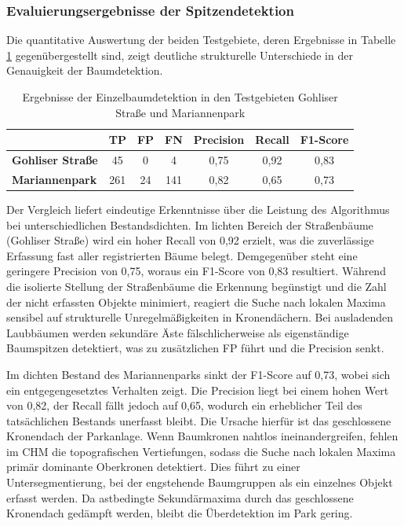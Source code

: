 \subsubsection{Evaluierungsergebnisse der Spitzendetektion}

Die quantitative Auswertung der beiden Testgebiete, deren Ergebnisse in Tabelle \ref{tab:evaluierung} gegenübergestellt sind, zeigt deutliche strukturelle Unterschiede in der Genauigkeit der Baumdetektion.

\begin{table}[htbp]
\centering
\caption{Ergebnisse der Einzelbaumdetektion in den Testgebieten Gohliser Straße und Mariannenpark}
\label{tab:evaluierung}
\begin{tabular}{l c c c c c c}
\toprule
\textbf{} & \textbf{TP} & \textbf{FP} & \textbf{FN} & \textbf{Precision} & \textbf{Recall} & \textbf{F1-Score} \\
\midrule
\textbf{Gohliser Straße} & 45 & 0 & 4 & 0,75 & 0,92 & 0,83 \\
\addlinespace
\textbf{Mariannenpark} & 261 & 24 & 141 & 0,82 & 0,65 & 0,73 \\
\bottomrule
\end{tabular}
\end{table}

Der Vergleich liefert eindeutige Erkenntnisse über die Leistung des Algorithmus bei unterschiedlichen Bestandsdichten. Im lichten Bereich der Straßenbäume (Gohliser Straße) wird ein hoher Recall von 0,92 erzielt, was die zuverlässige Erfassung fast aller registrierten Bäume belegt. Demgegenüber steht eine geringere Precision von 0,75, woraus ein F1-Score von 0,83 resultiert. Während die isolierte Stellung der Straßenbäume die Erkennung begünstigt und die Zahl der nicht erfassten Objekte minimiert, reagiert die Suche nach lokalen Maxima sensibel auf strukturelle Unregelmäßigkeiten in Kronendächern. Bei ausladenden Laubbäumen werden sekundäre Äste fälschlicherweise als eigenständige Baumspitzen detektiert, was zu zusätzlichen FP führt und die Precision senkt.

Im dichten Bestand des Mariannenparks sinkt der F1-Score auf 0,73, wobei sich ein entgegengesetztes Verhalten zeigt. Die Precision liegt bei einem hohen Wert von 0,82, der Recall fällt jedoch auf 0,65, wodurch ein erheblicher Teil des tatsächlichen Bestands unerfasst bleibt. Die Ursache hierfür ist das geschlossene Kronendach der Parkanlage. Wenn Baumkronen nahtlos ineinandergreifen, fehlen im CHM die topografischen Vertiefungen, sodass die Suche nach lokalen Maxima primär dominante Oberkronen detektiert. Dies führt zu einer Untersegmentierung, bei der engstehende Baumgruppen als ein einzelnes Objekt erfasst werden. Da astbedingte Sekundärmaxima durch das geschlossene Kronendach gedämpft werden, bleibt die Überdetektion im Park gering.

